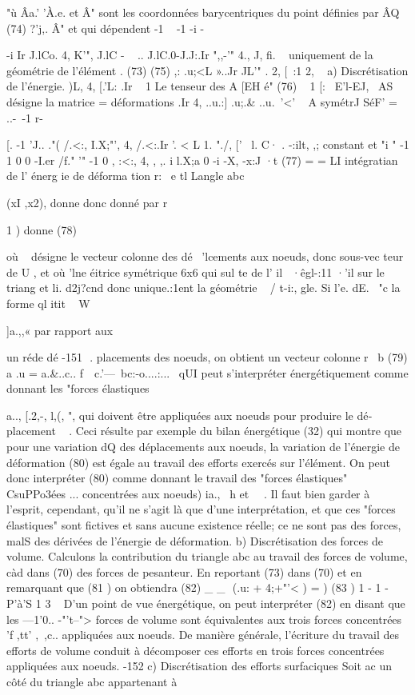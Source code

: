 {{{{{{{{{"ù Âa.' 'À.e. et Â" sont les coordonnées barycentriques du point 
définies par 
ÂQ 
(74) 
?'j,. 
Â" 
et qui dépendent 
-1 
~ 
-1
-i -{ -i 
Ir
J.lCo. 
4, K'", 
J.lC
-
~ 
.. 
J.lC.0-J.J:.Ir ",,-'" 
4.,
J,
fi. ~ 
uniquement de la géométrie de l'élément . (73) 
(75) ,: 
.u;<L »..Jr JL'" 
. 2,
[~:1 
2, 
~ 
a) Discrétisation de l'énergie. 
)L, 4,
[.'L: .Ir ~ 1 
Le tenseur des 
A
[EH é"
(76) 
~
1 
[:~
E'l-EJ,~ 
AS 
désigne la matrice 
= 
déformations 
.Ir 
4, ..u.:] 
.u;.&­
..u.~'<' 
~ 
A symétrJ SéF' 
= 
..-\ -1 
r-{ [. -1 
'J.. 
."( /.<:, I.X;"', 
4, 
/.<:.Ir '. <­
L 1. "./, 
[' 
~l. 
C· . -:ilt, ,; constant et 
"i " 
-1 1 
0 0 
-I.er
/f." '" 
-1 0
, :<:, 4, 
,
,. i 
l.X;a 
0 -i
-X, 
-x:J
·t 
(77) 
= 
= LI intégratian de l' énerg ie de déforma tion r: ~e tl Langle abc 


(xI ,x2), 
donne donc 
donné par 
r 

1 
) 
donne 
(78) 

où  ~  désigne le vecteur  colonne  des  dé~  'lcements  aux  noeuds,  donc  
sous-vec teur  de  U  ,  et où  'lne  éitrice  symétrique  6x6  qui  
sul te  de  l' il ~·êgl-:11­ ·'il  sur  le  triang  et  li.  d2j?cnd  donc  unique.:1ent  
la  géométrie  ~ /  t­-i:,  gle.  
Si  l'e.  dE.  ~"c  la  forme  ql  itit  ~  W {]a.,,«­ par  rapport  aux  

un ré­de 
dé­
-151 ­
.­
placements des noeuds, on obtient un vecteur colonne r 
~b 
(79) a .u 
= a.&..c.. 
f~~c.'---~bc:-o....:...~ 
qUI peut s'interpréter énergétiquement comme donnant les "forces élastiques 
{a.., [.2,-, l,(, ", qui 
doivent être appliquées aux noeuds pour produire le dé­
placement ~ . Ceci résulte par exemple du bilan énergétique (32) qui montre 
que pour une variation dQ des déplacements aux noeuds, la variation de 
l'énergie de déformation 
(80) 
est égale au travail des efforts exercés sur l'élément. On peut donc inter­préter (80) comme donnant le travail des "forces élastiques" CsuPPo3ées 
... 
concentrées aux noeuds) ia., ~h et ~~. Il faut bien garder à l'esprit, 
cependant, qu'il ne s'agit là que d'une interprétation, et que ces "forces 
élastiques" sont fictives et sans aucune existence réelle; ce ne sont pas 
des forces, malS des dérivées de l'énergie de déformation. 
b) Discrétisation des forces de volume. Calculons la contribution du triangle abc au travail des forces de volume, càd dans (70) des forces de pesanteur. En reportant (73) dans 
(70) et en remarquant que 
(81 ) 
on obtiendra 
(82) _ _  (.u: + 4;+"'< ) = 
) 
(83 ) 1 - 1 -P'à'S 1 3 ~ 
D'un point de vue énergétique, on peut interpréter (82) en disant que les 
---1'0.. -"'t--">
forces de volume sont équivalentes aux trois forces concentrées 'f ,tt' ,~,c.. appliquées aux noeuds. 
De manière générale, l'écriture du travail des efforts de volume conduit à décomposer ces efforts en trois forces concentrées appliquées aux noeuds. 
-152 ­c) Discrétisation des efforts surfaciques 
Soit ac un côté du triangle abc appartenant à 

}}}}}}}}}}}}}
